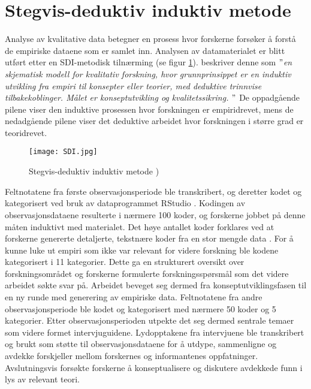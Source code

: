 \section{Stegvis-deduktiv induktiv metode}
\label{section:sdi} 
Analyse av kvalitative data betegner en prosess hvor forskerne forsøker å forstå de empiriske dataene som er samlet inn. Analysen av datamaterialet er blitt utført etter en SDI-metodisk tilnærming (se figur \ref{SDI}). \citet{Tjora} beskriver denne som \textit{$"$en skjematisk modell for kvalitativ forskning, hvor grunnprinsippet er en induktiv utvikling fra empiri til konsepter eller teorier, med deduktive trinnvise tilbakekoblinger. Målet er konseptutvikling og kvalitetssikring. $"$} De oppadgående pilene viser den induktive prosessen hvor forskningen er empiridrevet, mens de nedadgående pilene viser det deduktive arbeidet hvor forskningen i større grad er teoridrevet.

\begin{figure}[H]
\centering
\texttt{[image: SDI.jpg]}
\caption{Stegvis-deduktiv induktiv metode \citep{Tjora})}
\label{SDI}
\end{figure}

\noindent
Feltnotatene fra første observasjonsperiode ble transkribert, og deretter kodet og kategorisert ved bruk av dataprogrammet RStudio \citep{Rstudio}. Kodingen av observasjonsdataene resulterte i nærmere 100 koder, og forskerne jobbet på denne måten induktivt med materialet. Det høye antallet koder forklares ved at forskerne genererte detaljerte, tekstnære koder fra en stor mengde data \citep{Tjora}. For å kunne luke ut empiri som ikke var relevant for videre forskning ble kodene kategorisert i 11 kategorier. Dette ga en strukturert oversikt over forskningsområdet og forskerne formulerte forskningsspørsmål som det videre arbeidet søkte svar på. Arbeidet beveget seg dermed fra konseptutviklingsfasen til en ny runde med generering av empiriske data. Feltnotatene fra andre observasjonsperiode ble kodet og kategorisert med nærmere 50 koder og 5 kategorier. Etter observasjonsperioden utpekte det seg dermed sentrale temaer som videre formet intervjuguidene. Lydopptakene fra intervjuene ble transkribert og brukt som støtte til observasjonsdataene for å utdype, sammenligne og avdekke forskjeller mellom forskernes og informantenes oppfatninger. Avslutningsvis forsøkte forskerne å konseptualisere og diskutere avdekkede funn i lys av relevant teori. 


